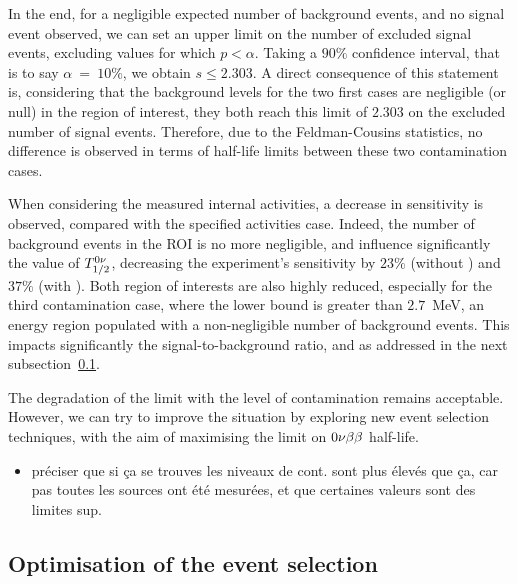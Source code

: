 In the end, for a negligible expected number of background events, and no signal event observed, we can set an upper limit on the number of excluded signal events, excluding values for which $p < \alpha$.
Taking a $90\%$ confidence interval, that is to say $\alpha~=~10\%$, we obtain $s \leq 2.303$.
A direct consequence of this statement is, considering that the background levels for the two first cases are negligible (or null) in the region of interest, they both reach this limit of $2.303$ on the excluded number of signal events.
Therefore, due to the Feldman-Cousins statistics, no difference is observed in terms of half-life limits between these two contamination cases.

When considering the measured internal activities, a decrease in sensitivity is observed, compared with the specified activities case.
Indeed, the number of background events in the ROI is no more negligible, and influence significantly the value of $T_{1/2}^{0\nu}$, decreasing the experiment's sensitivity by $23\%$ (without \Bi) and $37\%$ (with \Bi).
Both region of interests are also highly reduced, especially for the third contamination case, where the lower bound is greater than $2.7$~MeV, an energy region populated with a non-negligible number of background events.
This impacts significantly the signal-to-background ratio, and as addressed in the next subsection~\ref{subsec:opti_ev_selection}.

The degradation of the limit with the level of contamination remains acceptable.
However, we can try to improve the situation by exploring new event selection techniques, with the aim of maximising the limit on $0\nu\beta\beta$ half-life.

\begin{itemize}
\item préciser que si ça se trouves les niveaux de cont. sont plus élevés que ça, car pas toutes les sources ont été mesurées, et que certaines valeurs sont des limites sup.
\end{itemize}

\subsection{Optimisation of the event selection}
\label{subsec:opti_ev_selection}

